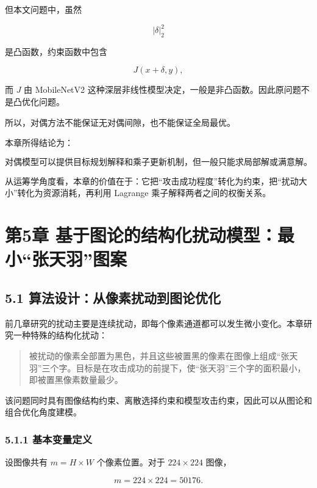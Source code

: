 ﻿\documentclass[UTF8,zihao=-4,fontset=none]{ctexart}
\begin{document}
但本文问题中，虽然

\[
|\delta|_2^2
\]

是凸函数，约束函数中包含

\[
J(x+\delta,y),
\]

而 \(J\) 由 MobileNetV2 这种深层非线性模型决定，一般是非凸函数。因此原问题不是凸优化问题。

所以，对偶方法不能保证无对偶间隙，也不能保证全局最优。

本章所得结论为：

\[
\text{对偶模型可以提供目标规划解释和乘子更新机制，但一般只能求局部解或满意解。}
\]

从运筹学角度看，本章的价值在于：它把“攻击成功程度”转化为约束，把“扰动大小”转化为资源消耗，再利用 Lagrange 乘子解释两者之间的权衡关系。

\clearpage
\section*{第5章 基于图论的结构化扰动模型：最小“张天羽”图案}
{}

\subsection*{5.1 算法设计：从像素扰动到图论优化}
{}

前几章研究的扰动主要是连续扰动，即每个像素通道都可以发生微小变化。本章研究一种特殊的结构化扰动：

\begin{quote}
被扰动的像素全部置为黑色，并且这些被置黑的像素在图像上组成“张天羽”三个字。目标是在攻击成功的前提下，使“张天羽”三个字的面积最小，即被置黑像素数量最少。
\end{quote}

该问题同时具有图像结构约束、离散选择约束和模型攻击约束，因此可以从图论和组合优化角度建模。

\subsubsection*{5.1.1 基本变量定义}
{}

设图像共有 \(m=H\times W\) 个像素位置。对于 \(224\times224\) 图像，

\[
m=224\times224=50176.
\]
\end{document}
